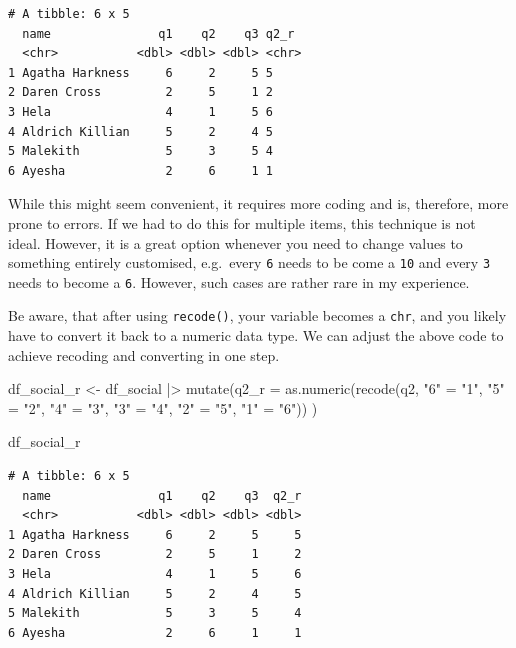 \documentclass[
  letterpaper,
]{krantz}
\makeatletter
\newenvironment{Shaded}{\begin{snugshade}}{\end{snugshade}}
\newcommand{\AttributeTok}[1]{\textcolor[rgb]{0.40,0.45,0.13}{#1}}
\newcommand{\FunctionTok}[1]{\textcolor[rgb]{0.28,0.35,0.67}{#1}}
\newcommand{\NormalTok}[1]{\textcolor[rgb]{0.00,0.23,0.31}{#1}}
\newcommand{\OtherTok}[1]{\textcolor[rgb]{0.00,0.23,0.31}{#1}}
\newcommand{\SpecialCharTok}[1]{\textcolor[rgb]{0.37,0.37,0.37}{#1}}
\newcommand{\StringTok}[1]{\textcolor[rgb]{0.13,0.47,0.30}{#1}}
\newenvironment{kframe}{%
\medskip{}
\setlength{\fboxsep}{.8em}
 \def\at@end@of@kframe{}%
 \ifinner\ifhmode%
  \def\at@end@of@kframe{\end{minipage}}%
  \begin{minipage}{\columnwidth}%
 \fi\fi%
 \def\FrameCommand##1{\hskip\@totalleftmargin \hskip-\fboxsep
 \colorbox{shadecolor}{##1}\hskip-\fboxsep
     \hskip-\linewidth \hskip-\@totalleftmargin \hskip\columnwidth}%
 \MakeFramed {\advance\hsize-\width
   \@totalleftmargin\z@ \linewidth\hsize
   \@setminipage}}%
 {\par\unskip\endMakeFramed%
 \at@end@of@kframe}
\renewenvironment{Shaded}{\begin{kframe}}{\end{kframe}}
\makeatother
\begin{document}
\begin{verbatim}
# A tibble: 6 x 5
  name               q1    q2    q3 q2_r 
  <chr>           <dbl> <dbl> <dbl> <chr>
1 Agatha Harkness     6     2     5 5    
2 Daren Cross         2     5     1 2    
3 Hela                4     1     5 6    
4 Aldrich Killian     5     2     4 5    
5 Malekith            5     3     5 4    
6 Ayesha              2     6     1 1    
\end{verbatim}

While this might seem convenient, it requires more coding and is,
therefore, more prone to errors. If we had to do this for multiple
items, this technique is not ideal. However, it is a great option
whenever you need to change values to something entirely customised,
e.g.~every \texttt{6} needs to be come a \texttt{10} and every
\texttt{3} needs to become a \texttt{6}. However, such cases are rather
rare in my experience.

Be aware, that after using \texttt{recode()}, your variable becomes a
\texttt{chr}, and you likely have to convert it back to a numeric data
type. We can adjust the above code to achieve recoding and converting in
one step.

\begin{Shaded}
\begin{Highlighting}[]
\NormalTok{df\_social\_r }\OtherTok{\textless{}{-}}
\NormalTok{  df\_social }\SpecialCharTok{|\textgreater{}}
  \FunctionTok{mutate}\NormalTok{(}\AttributeTok{q2\_r =} \FunctionTok{as.numeric}\NormalTok{(}\FunctionTok{recode}\NormalTok{(q2,}
                                  \StringTok{"6"} \OtherTok{=} \StringTok{"1"}\NormalTok{,}
                                  \StringTok{"5"} \OtherTok{=} \StringTok{"2"}\NormalTok{,}
                                  \StringTok{"4"} \OtherTok{=} \StringTok{"3"}\NormalTok{,}
                                  \StringTok{"3"} \OtherTok{=} \StringTok{"4"}\NormalTok{,}
                                  \StringTok{"2"} \OtherTok{=} \StringTok{"5"}\NormalTok{,}
                                  \StringTok{"1"} \OtherTok{=} \StringTok{"6"}\NormalTok{))}
\NormalTok{  )}

\NormalTok{df\_social\_r}
\end{Highlighting}
\end{Shaded}

\begin{verbatim}
# A tibble: 6 x 5
  name               q1    q2    q3  q2_r
  <chr>           <dbl> <dbl> <dbl> <dbl>
1 Agatha Harkness     6     2     5     5
2 Daren Cross         2     5     1     2
3 Hela                4     1     5     6
4 Aldrich Killian     5     2     4     5
5 Malekith            5     3     5     4
6 Ayesha              2     6     1     1
\end{verbatim}
\end{document}
